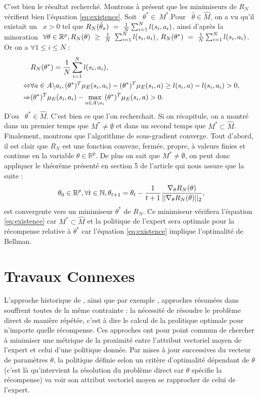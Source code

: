 \documentclass[publibook-draft]{CAp2012}
\begin{document}
C'est bien le résultat recherché. Montrons à présent que les minimiseurs de $R_N$ vérifient bien l'équation \eqref{eq:existence}.
Soit ~$\theta^*\in\ M^*$.Pour ~$\hat{\theta}\in \hat{M}$, on a vu qu'il existait un ~$x>0$ tel que $R_N(\hat{\theta}_x)~=~{1\over N} \sum_{i=1}^N l(s_i,a_i)$, ainsi d'après la minoration $~\forall \theta\in\mathbb{R}^p, R_N(\theta)~\geq~{1\over N}~\sum_{i=1}^Nl(s_i,a_i)$, $R_N(\theta^*)~=~{1\over N} \sum_{i=1}^N l(s_i,a_i)$. Or on a $\forall 1\leq i \leq N$ :
\begin{align}
&R_N(\theta^*)={1\over N} \sum_{i=1}^N l(s_i,a_i),\\
\Leftrightarrow&\forall a \in A \backslash a_i,  (\theta^*)^T\mu_E(s_i,a_i)-(\theta^*)^T\mu_E(s_i,a)\geq l(s_i,a)- l(s_i,a_i)>0,\\
\Rightarrow&(\theta^*)^T\mu_E(s_i,a_i)-\max_{a \in A \backslash a_i}(\theta^*)^T\mu_E(s_i,a)>0.
\end{align}
D'ou ~$\theta^*\in\hat{M}$. C'est bien ce que l'on recherchait. Si on récapitule, on a montré dans un premier temps que $M^*\neq\emptyset$ et dans un second temps que $M^*\subset\hat{M}$.
Finalement, montrons que l'algorithme de sous-gradient converge. Tout d'abord, il est clair que $R_N$ est une fonction convexe, fermée, propre, à valeurs finies et continue en la variable $\theta\in\mathbb{R}^p$. De plus on sait que $M^*\neq\emptyset$, on peut donc appliquer le théorème présenté en section 5 de l'article \cite{correa1993convergence} qui nous assure que la suite :
\begin{equation}
\theta_0\in\mathbb{R}^p, \forall t\in\mathbb{N}, \theta_{t+1}=\theta_t -\frac{1}{t+1}{\nabla_\theta R_N(\theta) \over ||\nabla_\theta R_N(\theta)||_2},
\end{equation}
est convergente vers un minimiseur $\theta^*$ de $R_N$. Ce minimiseur vérifiera l'équation \eqref{eq:existence} car $M^*\subset\hat{M}$ et la politique de l'expert sera optimale pour la récompense relative à $\theta^*$ car l'équation \eqref{eq:existence} implique l'optimalité de Bellman.
\section{Travaux Connexes}
\label{biblio.sec}
L'approche historique de \cite{ng2000algorithms}, ainsi que par exemple \cite{abbeel2004apprenticeship,syed2008apprenticeship,syed2008game, ziebart2008maximum}, approches résumées dans \cite{neu2009training} souffrent toutes de la même contrainte : la nécessité de résoudre le problème direct de manière répétée, c'est à dire le calcul de la prolitique optimale pour n'importe quelle récompense. Ces approches ont pour point commun de chercher à minimiser une métrique de la proximité entre l'attribut vectoriel moyen de l'expert et celui d'une politique donnée. Par mises à jour successives du vecteur de paramètres $\theta$, la politique définie selon un critère d'optimalité dépendant de $\theta$ (c'est là qu'intervient la résolution du problème direct car $\theta$ spécifie la récompense) va voir son attribut vectoriel moyen se rapprocher de celui de l'expert.\\
\end{document}
